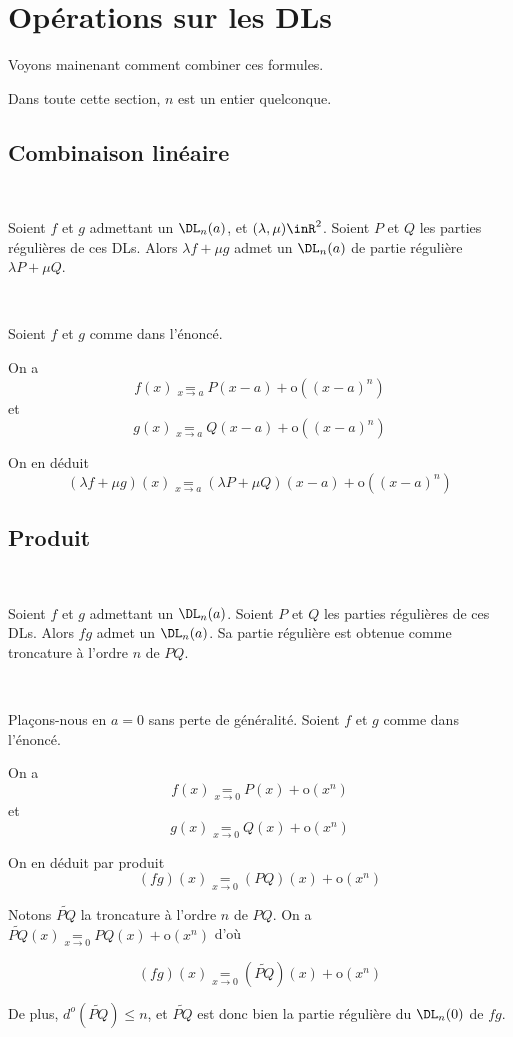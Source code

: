 \documentclass[12pt]{article}
\begin{document}
\section{Opérations sur les DLs}

Voyons mainenant comment combiner ces formules.

Dans toute cette section, $n$ est un entier quelconque. 

\subsection{Combinaison linéaire}

\begin{Prop}~

Soient $f$ et $g$ admettant un $\DL_n(a)$, et $(\lambda,
\mu)\inR^2$. Soient $P$ et $Q$ les parties régulières de ces DLs. Alors
$\lambda f + \mu g$ admet un $\DL_n(a)$ de partie régulière $\lambda P +
\mu Q$.

\end{Prop}

\begin{demo}~

Soient $f$ et $g$ comme dans l'énoncé.

On a $$f(x)\underset{x\rightarrow a}{=}P(x-a)+\text{o}((x-a)^n)$$ et
$$g(x)\underset{x\rightarrow a}{=}Q(x-a)+\text{o}((x-a)^n)$$ 

On en déduit 
$$(\lambda f+\mu g)(x)\underset{x\rightarrow a}{=}(\lambda P+\mu Q)(x-a)+\text{o}((x-a)^n)$$

\end{demo}


\subsection{Produit}

\begin{Prop}~

Soient $f$ et $g$ admettant un $\DL_n(a)$. Soient $P$ et $Q$ les parties
régulières de ces DLs. Alors $f g$ admet un $\DL_n(a)$. Sa partie régulière
est obtenue comme troncature à l'ordre $n$ de $PQ$.

\end{Prop}

\begin{demo}~

 Plaçons-nous en $a=0$ sans perte de
généralité. 
Soient $f$ et $g$ comme dans l'énoncé.

On a $$f(x)\underset{x\rightarrow 0}{=}P(x)+\text{o}(x^n)$$ et
$$g(x)\underset{x\rightarrow 0}{=}Q(x)+\text{o}(x^n)$$ 

On en déduit par produit
$$(fg)(x)\underset{x\rightarrow 0}{=}(PQ)(x)+\text{o}(x^n)$$

Notons $\widetilde{PQ}$ la troncature à l'ordre $n$ de $PQ$. On a
$\widetilde{PQ}(x)\underset{x\rightarrow 0}{=}PQ(x)+\text{o}(x^n)$ d'où 

$$(fg)(x)\underset{x\rightarrow 0}{=}(\widetilde{PQ})(x)+\text{o}(x^n)$$

De plus, $d^o(\widetilde{PQ}) \leq n$, et $\widetilde{PQ}$ est donc bien la partie
régulière du $\DL_n(0)$ de $fg$.

\end{demo}
\end{document}
